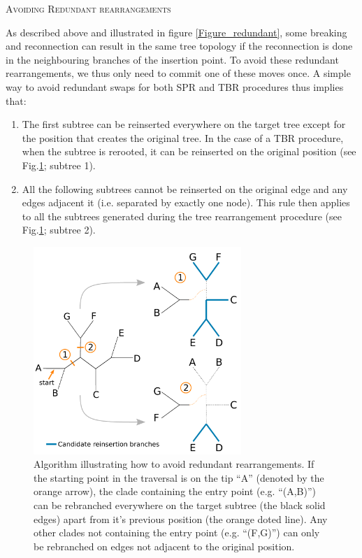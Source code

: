 \documentclass[12pt,letterpaper]{article}
\renewcommand{\section}[1]{%
\bigskip
\begin{center}
\begin{Large}
\normalfont\scshape #1
\medskip
\end{Large}
\end{center}}
\begin{document}
\section{Avoiding Redundant rearrangements}
As described above and illustrated in figure \ref{Figure_redundant}, some breaking and reconnection can result in the same tree topology if the reconnection is done in the neighbouring branches of the insertion point.
To avoid these redundant rearrangements, we thus only need to commit one of these moves once.
A simple way to avoid redundant swaps for both SPR and TBR procedures thus implies that:
\begin{enumerate}
    \item The first subtree can be reinserted everywhere on the target tree except for the position that creates the original tree. In the case of a TBR procedure, when the subtree is rerooted, it can be reinserted on the original position (see Fig.\ref{Figure_Neighbor}; subtree 1).
    \item All the following subtrees cannot be reinserted on the original edge and any edges adjacent it (i.e. separated by exactly one node). This rule then applies to all the subtrees generated during the tree rearrangement procedure (see Fig.\ref{Figure_Neighbor}; subtree 2).
\end{enumerate}

\begin{figure}[!htbp]
\centering
   \includegraphics[width=0.7\textwidth]{Figure/Figure_Neighbour.pdf}
\caption{Algorithm illustrating how to avoid redundant rearrangements. If the starting point in the traversal is on the tip ``A'' (denoted by the orange arrow), the clade containing the entry point (e.g. ``(A,B)'') can be rebranched everywhere on the target subtree (the black solid edges) apart from it's previous position (the orange doted line). Any other clades not containing the entry point (e.g. ``(F,G)'') can only be rebranched on edges not adjacent to the original position.}
\label{Figure_Neighbor}
\end{figure}
\end{document}
